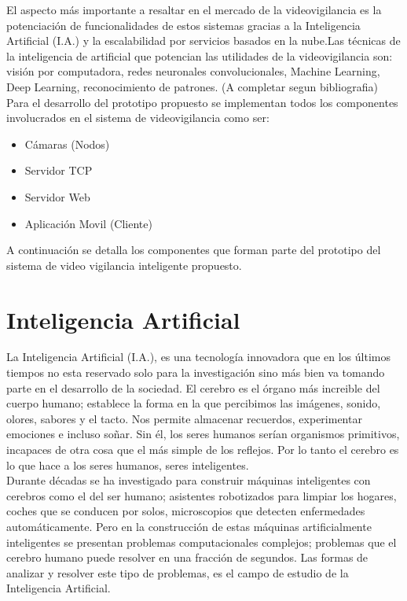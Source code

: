 El aspecto más importante a resaltar en el mercado de la videovigilancia es la potenciación de funcionalidades de estos sistemas gracias a la Inteligencia Artificial (I.A.) y la escalabilidad por servicios basados en la nube.Las técnicas de la inteligencia de artificial que potencian las utilidades de la videovigilancia son: visión por computadora, redes neuronales convolucionales, Machine Learning, Deep Learning, reconocimiento de patrones. (A completar segun bibliografia)\\

Para el desarrollo del prototipo propuesto se implementan todos los componentes involucrados en el sistema de videovigilancia como ser:
\begin{itemize}
    \item Cámaras (Nodos)
    \item Servidor TCP
    \item Servidor Web
    \item Aplicación Movil (Cliente)
\end{itemize}

A continuación se detalla los componentes que forman parte del prototipo del sistema de video vigilancia inteligente propuesto.

\section{Inteligencia Artificial}
La Inteligencia Artificial (I.A.), es una tecnología innovadora que en los últimos tiempos no esta reservado solo para la investigación sino más bien va tomando parte en el desarrollo de la sociedad. El cerebro es el órgano más increible del cuerpo humano; establece la forma en la que percibimos las imágenes, sonido, olores, sabores y el tacto. Nos permite almacenar recuerdos, experimentar emociones e incluso soñar. Sin él, los seres humanos serían organismos primitivos, incapaces de otra cosa que el más simple de los reflejos. Por lo tanto el cerebro es lo que hace a los seres humanos, seres inteligentes.\\

Durante décadas se ha investigado para construir máquinas inteligentes con cerebros como el del ser humano; asistentes robotizados para limpiar los hogares, coches que se conducen por solos, microscopios que detecten enfermedades automáticamente. Pero en la construcción de estas máquinas artificialmente inteligentes se presentan problemas computacionales complejos; problemas que el cerebro humano puede resolver en una fracción de segundos. Las formas de analizar y resolver este tipo de problemas, es el campo de estudio de la Inteligencia Artificial.

